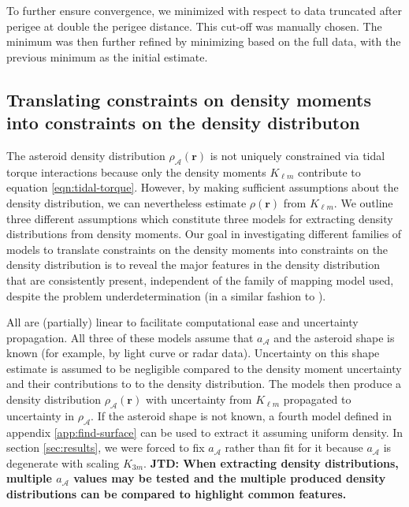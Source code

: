 \documentclass[fleqn,usenatbib]{mnras}
\newcommand{\jtd}[1]{ {\bf{\color{red} JTD: #1}} }
\begin{document}
To further ensure convergence, we minimized with respect to data truncated after perigee at double the perigee distance. This cut-off was manually chosen. The minimum was then further refined by minimizing based on the full data, with the previous minimum as the initial estimate.


\subsection{Translating constraints on density moments into constraints on the density distributon}
\label{sec:density-distro}

The asteroid density distribution $\rho_\mathcal{A}(\bm r)$ is not uniquely constrained via tidal torque interactions because only the density moments $K_{\ell m}$ contribute to equation \ref{eqn:tidal-torque}. However, by making sufficient assumptions about the density distribution, we can nevertheless estimate $\rho(\bm r)$ from $K_{\ell m}$. We outline three different assumptions which constitute three models for extracting density distributions from density moments. 
Our goal in investigating different families of models to translate constraints on the density moments into constraints on the density distribution is to reveal the major features in the density distribution that are consistently present, independent of the family of mapping model used, despite the problem underdetermination (in a similar fashion to \cite{de2012towards}).

All are (partially) linear to facilitate computational ease and uncertainty propagation. All three of these models assume that $a_\mathcal{A}$ and the asteroid shape is known (for example, by light curve or radar data). Uncertainty on this shape estimate is assumed to be negligible compared to the density moment uncertainty and their contributions to to the density distribution. The models then produce a density distribution $\rho_\mathcal{A}(\bm r)$ with uncertainty from $K_{\ell m}$ propagated to uncertainty in $\rho_\mathcal{A}$. If the asteroid shape is not known, a fourth model defined in appendix \ref{app:find-surface} can be used to extract it assuming uniform density. In section \ref{sec:results}, we were forced to fix $a_\mathcal{A}$ rather than fit for it because $a_\mathcal{A}$ is degenerate with scaling $K_{3m}$. \jtd{When extracting density distributions, multiple $a_\mathcal{A}$ values may be tested and the multiple produced density distributions can be compared to highlight common features.}
\end{document}
